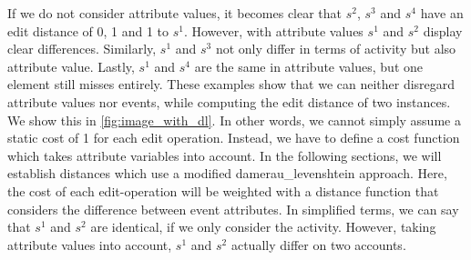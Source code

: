 \documentclass[./../../paper.tex]{subfiles}
\begin{document}
\noindent If we do not consider attribute values, it becomes clear that $s^2$, $s^3$ and $s^4$ have an edit distance of 0, 1 and 1 to $s^1$. However, with attribute values $s^1$ and $s^2$ display clear differences. Similarly, $s^1$ and $s^3$ not only differ in terms of activity but also attribute value. Lastly, $s^1$ and $s^4$ are the same in attribute values, but one element still misses entirely. These examples show that we can neither disregard attribute values nor events, while computing the edit distance of two \glspl{instance}. We show this in \autoref{fig:image_with_dl}. In other words, we cannot simply assume a static cost of 1 for each edit operation. Instead, we have to define a cost function which takes attribute variables into account. In the following sections, we will establish distances which use a modified \gls{damerau_levenshtein} approach. Here, the cost of each edit-operation will be weighted with a distance function that considers the difference between event attributes. In simplified terms, we can say that $s^1$ and $s^2$ are identical, if we only consider the activity. However, taking attribute values into account, $s^1$ and $s^2$ actually differ on two accounts. 

\end{document}
